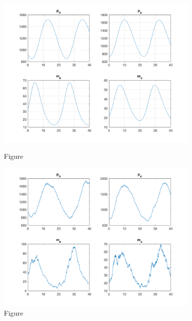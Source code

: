 \documentclass[12pt]{article}
\renewcommand{\(}{\left (}
\renewcommand{\)}{\right )}
\begin{document}
\begin{figure}[h]
    \centering
	\begin{minipage}{0.45\textwidth}
		\centering
		\includegraphics[width=0.89\textwidth]{single_oscillator_zoom_in.png}
		\caption*{\small Figure}
	\end{minipage}
	\begin{minipage}{0.45\textwidth}
		\centering
		\includegraphics[width=0.89\textwidth]{sto_single_oscillator_zoom_in.png}
		\caption*{\small Figure}
	\end{minipage}
\end{figure}
\end{document}
